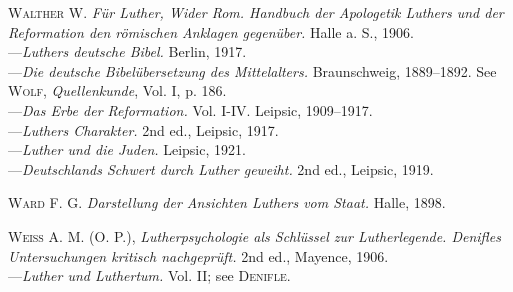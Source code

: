 \textsc{Walther W.} \textit{Für Luther, Wider Rom. Handbuch der Apologetik Luthers
und der Reformation den römischen Anklagen gegenüber.} Halle a. S., 1906. \\
---\textit{Luthers deutsche Bibel.} Berlin, 1917. \\
---\textit{Die deutsche Bibelübersetzung des Mittelalters.} Braunschweig, 1889--1892.
See \textsc{Wolf}, \textit{Quellenkunde}, Vol. I, p. 186. \\
---\textit{Das Erbe der Reformation.} Vol. I-IV. Leipsic, 1909--1917. \\
---\textit{Luthers Charakter.} 2nd ed., Leipsic, 1917. \\
---\textit{Luther und die Juden.} Leipsic, 1921. \\
---\textit{Deutschlands Schwert durch Luther geweiht.} 2nd ed., Leipsic, 1919.

\textsc{Ward F. G.} \textit{Darstellung der Ansichten Luthers vom Staat.} Halle, 1898.

\textsc{Weiss A. M. (O. P.)}, \textit{Lutherpsychologie als Schlüssel zur Lutherlegende.
Denifles Untersuchungen kritisch nachgeprüft.} 2nd ed., Mayence, 1906. \\
---\textit{Luther und Luthertum.} Vol. II; see \textsc{Denifle.}

